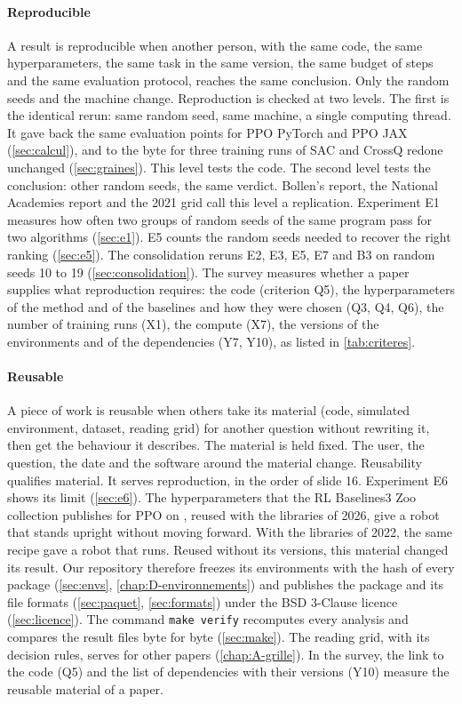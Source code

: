 \paragraph{Reproducible}
A result is reproducible when another person, with the same code, the same hyperparameters, the same
task in the same version, the same budget of steps and the same evaluation protocol, reaches the same
conclusion. Only the random seeds and the machine change. Reproduction is checked at two levels. The
first is the identical rerun: same random seed, same machine, a single computing thread. It gave back
the same evaluation points for PPO PyTorch and PPO JAX (\cref{sec:calcul}), and to the byte for three training
runs of SAC and CrossQ redone unchanged (\cref{sec:graines}). This level tests the code. The second level tests the conclusion: other
random seeds, the same verdict. Bollen's report, the National Academies report and the 2021 grid call this level a replication. Experiment
E1 measures how often two groups of random seeds of the same program pass for two algorithms
(\cref{sec:e1}). E5 counts the random seeds needed to recover the right ranking (\cref{sec:e5}). The
consolidation reruns E2, E3, E5, E7 and B3 on random seeds 10 to 19 (\cref{sec:consolidation}). The
survey measures whether a paper supplies what reproduction requires: the code (criterion Q5), the
hyperparameters of the method and of the baselines and how they were chosen (Q3, Q4, Q6), the number of
training runs (X1), the compute (X7), the versions of the environments and of the dependencies (Y7,
Y10), as listed in \cref{tab:criteres}.

\paragraph{Reusable}
A piece of work is reusable when others take its material (code, simulated environment, dataset,
reading grid) for another question without rewriting it, then get the behaviour it describes. The
material is held fixed. The user, the question, the date and the software around the material change.
Reusability qualifies material. It serves reproduction, in the order of slide 16. Experiment E6 shows
its limit (\cref{sec:e6}). The hyperparameters that the RL Baselines3 Zoo collection publishes for PPO
on , reused with the libraries of 2026, give a robot that stands upright without moving
forward. With the libraries of 2022, the same recipe gave a robot that runs. Reused without its
versions, this material changed its result. Our repository therefore freezes its environments with the hash of
every package (\cref{sec:envs}, \cref{chap:D-environnements}) and publishes the package and its file
formats (\cref{sec:paquet}, \cref{sec:formats}) under the BSD 3-Clause licence (\cref{sec:licence}).
The command \texttt{make verify} recomputes every analysis and compares the result files byte for byte
(\cref{sec:make}). The reading grid, with its decision rules, serves for other papers
(\cref{chap:A-grille}). In the survey, the link to the code (Q5) and the list of dependencies with
their versions (Y10) measure the reusable material of a paper.

